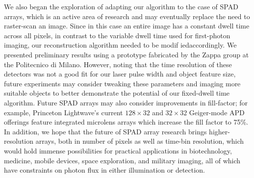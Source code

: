 We also began the exploration of adapting our algorithm to the case of SPAD arrays, which is an active area of research and may eventually replace the need to raster-scan an image. Since in this case an entire image has a constant dwell time across all pixels, in contrast to the variable dwell time used for first-photon imaging, our reconstruction algorithm needed to be modif iedaccordingly. We presented preliminary results using a prototype fabricated by the Zappa group at the Politecnico di Milano. However, noting that the time resolution of these detectors was not a good fit for our laser pulse width and object feature size, future experiments may consider tweaking these parameters and imaging more suitable objects to better demonstrate the potential of our fixed-dwell time algorithm. Future SPAD arrays may also consider improvements in fill-factor; for example, Princeton Lightwave's current $128\times32$ and $32\times32$ Geiger-mode APD offerings \cite{princetonlightwave} feature integrated microlens arrays which increase the fill factor to 75\%. In addition, we hope that the future of SPAD array research brings higher-resolution arrays, both in number of pixels as well as time-bin resolution, which would hold immense possibilities for practical applications in biotechnology, medicine, mobile devices, space exploration, and military imaging, all of which have constraints on photon flux in either illumination or detection.

